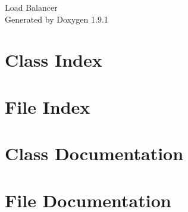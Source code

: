 \let\mypdfximage\pdfximage\def\pdfximage{\immediate\mypdfximage}\documentclass[twoside]{book}
\newcommand{\+}{\discretionary{\mbox{\scriptsize$\hookleftarrow$}}{}{}}
\newcommand{\clearemptydoublepage}{%
  \newpage{\pagestyle{empty}\cleardoublepage}%
}
\begin{document}
\raggedbottom

\hypersetup{pageanchor=false,
             bookmarksnumbered=true,
             pdfencoding=unicode
            }
\begin{titlepage}
\vspace*{7cm}
\begin{center}%
{\Large Load Balancer }\\
\vspace*{1cm}
{\large Generated by Doxygen 1.9.1}\\
\end{center}
\end{titlepage}
\clearemptydoublepage
{}
\tableofcontents
\clearemptydoublepage
{}
\hypersetup{pageanchor=true}

\chapter{Class Index}

\chapter{File Index}

\chapter{Class Documentation}




\chapter{File Documentation}






\backmatter
\newpage
{}
\clearemptydoublepage
{}
\printindex
\end{document}
